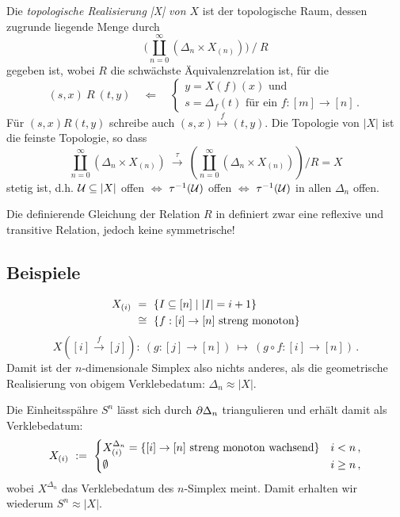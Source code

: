 \begin{definition}
  \label{def:top-realisierung}
  Die \emph{topologische Realisierung |X| von $X$} ist der topologische Raum,
  dessen zugrunde liegende Menge durch 
  \[ \Big(\coprod_{n=0}^\infty (\Delta_n \times X_{(n)})\Big)\ \big/ \ R\]
  gegeben ist, wobei $R$ die schwächste Äquivalenzrelation ist, für die
  \[ (s,x)\ R\ (t,y) \quad\Leftarrow\quad \left\{
    \begin{array}{l}
    y = X(f)(x) \text{ und} \\ 
    s = \Delta_f(t) \text{ für ein }f:[m]\to [n]\,.
    \end{array}\right.\] 
  Für $(s,x) R (t,y)$ schreibe auch $(s,x) \overset{f}{\mapsto} (t,y)$.
  Die Topologie von $|X|$ ist die feinste Topologie, so dass
  \[ \coprod_{n=0}^\infty (\Delta_n \times X_{(n)})\ \xrightarrow{\tau}\ 
    \left(\coprod_{n=0}^\infty (\Delta_n \times X_{(n)}) \right)\big/ R = X\]
  stetig ist, d.h. $\mathcal{U} \subseteq |X|$ offen $\Leftrightarrow$ 
  $\tau^{-1}(\mathcal{U})$ offen $\Leftrightarrow$ $\tau^{-1}(\mathcal{U})$ in allen $\Delta_n$
  offen.
\end{definition}


\begin{bemerkung}
  Die definierende Gleichung der Relation $R$ in 
   definiert zwar eine reflexive und transitive
  Relation, jedoch keine symmetrische!
\end{bemerkung}

\subsection{Beispiele}

\begin{beispiel}
  \begin{align*}
    X_{(i)} \ &=\  \{ I\subseteq [n] \mid |I| = i+1\}\\
    \ &\cong\  \{ f: [i] \to [n] \text{ streng monoton}\}
  \end{align*}
  \[ X([i] \xrightarrow{f} [j]):\ 
    (g:[j]\to[n]) \ \longmapsto\  (g\circ f: [i]\to[n])\,.\]
  Damit ist der $n$-dimensionale Simplex also nichts anderes, als die
  geometrische Realisierung von obigem Verklebedatum: $\Delta_n \approx |X|$.
\end{beispiel}

\begin{beispiel}
  Die Einheitsspähre $S^n$ lässt sich durch $\partial\Delta_n$ triangulieren und
  erhält damit als Verklebedatum:
  \[ X_{(i)} \ :=\  \begin{cases}
    X_{(i)}^{\Delta_n} = \{[i] \to [n] \text{ streng monoton wachsend}\}
      & i < n\,,\\
      \emptyset & i \geq n\,,\end{cases}\]
  wobei $X^{\Delta_n}$ das Verklebedatum des $n$-Simplex meint.
  Damit erhalten wir wiederum $S^n \approx |X|$.
\end{beispiel}
